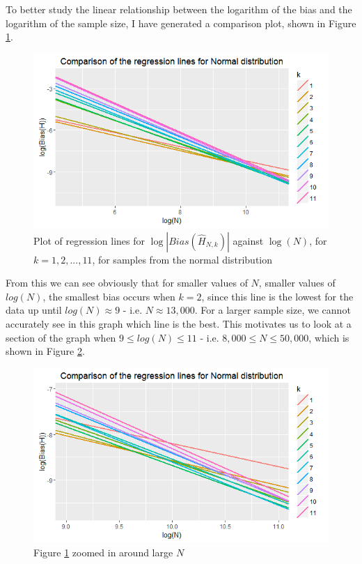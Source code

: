\documentclass{report}
\begin{document}
To better study the linear relationship between the logarithm of the bias and the logarithm of the sample size, I have generated a comparison plot, shown in Figure \ref{normal_comparison_graph}. 

\begin{figure}
  \begin{center}
    \includegraphics[width=\textwidth]{./Graphs/Best/NormalComparison.png}
  \end{center}
\caption{Plot of regression lines for $\log|Bias(\hat{H}_{N, k})|$ against $\log(N)$, for $k=1, 2,..., 11$, for samples from the normal distribution}
  \label{normal_comparison_graph}
\end{figure}

From this we can see obviously that for smaller values of $N$, smaller values of $log(N)$, the smallest bias occurs when $k=2$, since this line is the lowest for the data up until $log(N) \approx 9$ - i.e. $N \approx 13,000$. For a larger sample size, we cannot accurately see in this graph which line is the best. This motivates us to look at a section of the graph when $9 \leq log(N) \leq 11$ - i.e. $8,000 \leq N \leq 50,000$, which is shown in Figure \ref{normal_comparison_graph_zoomed}.

\begin{figure}
  \begin{center}
    \includegraphics[width=\textwidth]{./Graphs/Best/NormalComparisonZoom.png}
  \end{center}
\caption{Figure \ref{normal_comparison_graph} zoomed in around large $N$}
  \label{normal_comparison_graph_zoomed}
\end{figure}
\end{document}
